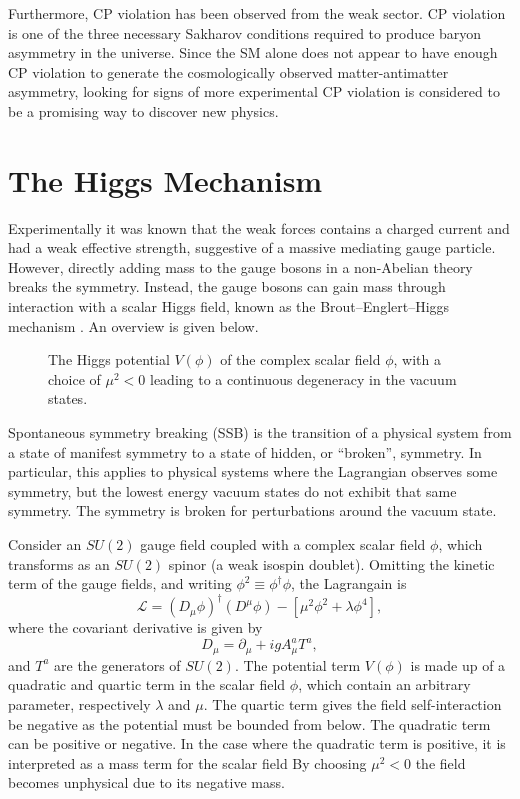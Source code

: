 Furthermore, CP violation has been observed from the weak sector.
CP violation is one of the three necessary Sakharov conditions required to produce baryon asymmetry in the universe.
Since the SM alone does not appear to have enough CP violation to generate the cosmologically observed matter-antimatter asymmetry, looking for signs of more experimental CP violation is considered to be a promising
way to discover new physics.


\section{The Higgs Mechanism}\label{sec:sm_higgs}

Experimentally it was known that the weak forces contains a charged current and had a weak effective strength, suggestive of a massive mediating gauge particle.
However, directly adding mass to the gauge bosons in a non-Abelian theory breaks the symmetry.
Instead, the gauge bosons can gain mass through interaction with a scalar Higgs field, known as the Brout–Englert–Higgs mechanism \cite{Englert:1964et,Higgs:1964pj,Guralnik:1964eu}.
An overview is given below.
%
\begin{figure}[!htbp]
  \centering
  
  \caption{
    The Higgs potential $V(\phi)$ of the complex scalar field $\phi$, with a choice of $\mu^2 < 0$ leading to a continuous degeneracy in the vacuum states.
  }
  \label{fig:higgs_potential}
\end{figure}
%
Spontaneous symmetry breaking (SSB) is the transition of a physical system from a state of manifest symmetry to a state of hidden, or ``broken'', symmetry. In particular, this applies to physical systems where the Lagrangian observes some symmetry, but the lowest energy vacuum states do not exhibit that same symmetry. The symmetry is broken for perturbations around the vacuum state.

Consider an $SU(2)$ gauge field  coupled with a complex scalar field $\phi$, which transforms as an $SU(2)$ spinor (a weak isospin doublet).
Omitting the kinetic term of the gauge fields, and writing $\phi^2 \equiv \phi^\dagger \phi$, the Lagrangain is
%
\begin{equation}\label{eq:sm_higgs_lagrangian}
  \mathcal{L} = (D_\mu \phi)^\dagger (D^\mu \phi) - \left[ \mu^2 \phi^2 + \lambda \phi^4 \right],
\end{equation}
%
where the covariant derivative is given by
%
\begin{equation}\label{eq:sm_higgs_cov_derivative}
  D_\mu = \partial_\mu + i g A^a_\mu T^a ,
\end{equation}
%
and $T^a$ are the generators of $SU(2)$.
The potential term $V(\phi)$ is made up of a quadratic and quartic term in the scalar field $\phi$, which contain an arbitrary parameter, respectively $\lambda$ and $\mu$.
The quartic term gives the field self-interaction be negative as the potential must be bounded from below.
The quadratic term can be positive or negative.
In the case where the quadratic term is positive, it is interpreted as a mass term for the scalar field
By choosing $\mu^2 < 0$ the field becomes unphysical due to its negative mass.

